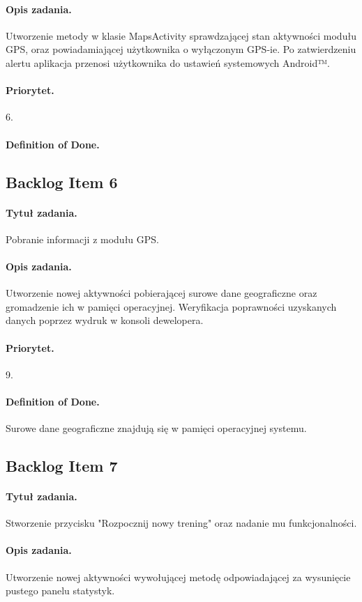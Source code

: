\documentclass[a4paper]{article}
\begin{document}
\paragraph{Opis zadania.} Utworzenie metody w klasie MapsActivity sprawdzającej stan aktywności modułu GPS, oraz powiadamiającej użytkownika o wyłączonym GPS-ie. Po zatwierdzeniu alertu aplikacja przenosi użytkownika do ustawień systemowych Android™.
\paragraph{Priorytet.} 6.
\paragraph{Definition of Done.}

\subsection{Backlog Item 6}
\paragraph{Tytuł zadania.} Pobranie informacji z modułu GPS.
\paragraph{Opis zadania.} Utworzenie nowej aktywności pobierającej surowe dane geograficzne oraz gromadzenie ich w pamięci operacyjnej. Weryfikacja poprawności uzyskanych danych poprzez wydruk w konsoli dewelopera.
\paragraph{Priorytet.} 9.
\paragraph{Definition of Done.} Surowe dane geograficzne znajdują się w pamięci operacyjnej systemu.

\subsection{Backlog Item 7}
\paragraph{Tytuł zadania.} Stworzenie przycisku "Rozpocznij nowy trening" oraz nadanie mu funkcjonalności.
\paragraph{Opis zadania.} Utworzenie nowej aktywności wywołującej metodę odpowiadającej za wysunięcie pustego panelu statystyk.
\end{document}
